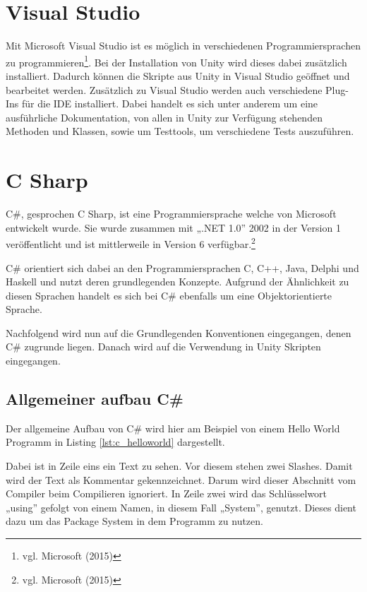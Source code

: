 \section{Visual Studio}

	Mit Microsoft Visual Studio ist es möglich in verschiedenen Programmiersprachen zu programmieren\footnote{vgl. Microsoft \cite{microsoft1} (2015)}. Bei der Installation von Unity wird dieses dabei zusätzlich installiert. Dadurch können die Skripte aus Unity in Visual Studio geöffnet und bearbeitet werden. Zusätzlich zu Visual Studio werden auch verschiedene Plug-Ins für die IDE installiert. Dabei handelt es sich unter anderem um eine ausführliche Dokumentation, von allen in Unity zur Verfügung stehenden Methoden und Klassen, sowie um Testtools, um verschiedene Tests auszuführen. 

\section{C Sharp}

	C\#, gesprochen C Sharp, ist eine Programmiersprache welche von Microsoft entwickelt wurde. Sie wurde zusammen mit „.NET 1.0” 2002 in der Version 1 veröffentlicht und ist mittlerweile in Version 6 verfügbar.\footnote{vgl. Microsoft \cite{microsoft2} (2015)} 

	C\# orientiert sich dabei an den Programmiersprachen C, C++, Java, Delphi und Haskell und nutzt deren grundlegenden Konzepte. Aufgrund der Ähnlichkeit zu diesen Sprachen handelt es sich bei C\# ebenfalls um eine Objektorientierte Sprache. 

	Nachfolgend wird nun auf die Grundlegenden Konventionen eingegangen, denen C\# zugrunde liegen. Danach wird auf die Verwendung in Unity Skripten eingegangen.

\subsection{Allgemeiner aufbau C\#}

	Der allgemeine Aufbau von C\# wird hier am Beispiel von einem Hello World Programm in Listing \ref{lst:c_helloworld} dargestellt. 

	Dabei ist in Zeile eins ein Text zu sehen. Vor diesem stehen zwei Slashes. Damit wird der Text als Kommentar gekennzeichnet. Darum wird dieser Abschnitt vom Compiler beim Compilieren ignoriert. In Zeile zwei wird das Schlüsselwort „using” gefolgt von einem Namen, in diesem Fall „System”, genutzt. Dieses dient dazu um das Package System in dem Programm zu nutzen.

